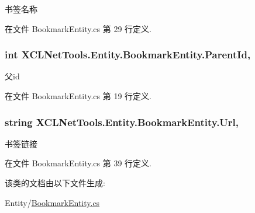 书签名称 



在文件 Bookmark\-Entity.\-cs 第 29 行定义.

\hypertarget{class_x_c_l_net_tools_1_1_entity_1_1_bookmark_entity_afd3c2002aa8d5edeac06f6ef32ba7454}{
\subsubsection[{Parent\-Id}]{\setlength{\rightskip}{0pt plus 5cm}int X\-C\-L\-Net\-Tools.\-Entity.\-Bookmark\-Entity.\-Parent\-Id\hspace{0.3cm}{\ttfamily [get]}, {\ttfamily [set]}}}\label{class_x_c_l_net_tools_1_1_entity_1_1_bookmark_entity_afd3c2002aa8d5edeac06f6ef32ba7454}


父id 



在文件 Bookmark\-Entity.\-cs 第 19 行定义.

\hypertarget{class_x_c_l_net_tools_1_1_entity_1_1_bookmark_entity_a88ebfe2441fd5804a82f5eaee1ce3232}{
\subsubsection[{Url}]{\setlength{\rightskip}{0pt plus 5cm}string X\-C\-L\-Net\-Tools.\-Entity.\-Bookmark\-Entity.\-Url\hspace{0.3cm}{\ttfamily [get]}, {\ttfamily [set]}}}\label{class_x_c_l_net_tools_1_1_entity_1_1_bookmark_entity_a88ebfe2441fd5804a82f5eaee1ce3232}


书签链接 



在文件 Bookmark\-Entity.\-cs 第 39 行定义.



该类的文档由以下文件生成\-:\begin{DoxyCompactItemize}
\item 
Entity/\hyperlink{_bookmark_entity_8cs}{Bookmark\-Entity.\-cs}\end{DoxyCompactItemize}
